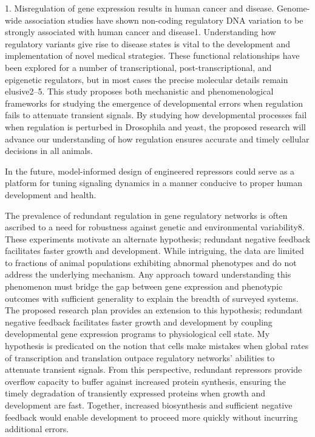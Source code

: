 1.	Misregulation of gene expression results in human cancer and disease. Genome-wide association studies have shown non-coding regulatory DNA variation to be strongly associated with human cancer and disease1. Understanding how regulatory variants give rise to disease states is vital to the development and implementation of novel medical strategies. These functional relationships have been explored for a number of transcriptional, post-transcriptional, and epigenetic regulators, but in most cases the precise molecular details remain elusive2–5. This study proposes both mechanistic and phenomenological frameworks for studying the emergence of developmental errors when regulation fails to attenuate transient signals. By studying how developmental processes fail when regulation is perturbed in Drosophila and yeast, the proposed research will advance our understanding of how regulation ensures accurate and timely cellular decisions in all animals.  

In the future, model-informed design of engineered repressors could serve as a platform for tuning signaling dynamics in a manner conducive to proper human development and health.

The prevalence of redundant regulation in gene regulatory networks is often ascribed to a need for robustness against genetic and environmental variability8. These experiments motivate an alternate hypothesis; redundant negative feedback facilitates faster growth and development. While intriguing, the data are limited to fractions of animal populations exhibiting abnormal phenotypes and do not address the underlying mechanism. Any approach toward understanding this phenomenon must bridge the gap between gene expression and phenotypic outcomes with sufficient generality to explain the breadth of surveyed systems. The proposed research plan provides an extension to this hypothesis; redundant negative feedback facilitates faster growth and development by coupling developmental gene expression programs to physiological cell state. My hypothesis is predicated on the notion that cells make mistakes when global rates of transcription and translation outpace regulatory networks’ abilities to attenuate transient signals. From this perspective, redundant repressors provide overflow capacity to buffer against increased protein synthesis, ensuring the timely degradation of transiently expressed proteins when growth and development are fast. Together, increased biosynthesis and sufficient negative feedback would enable development to proceed more quickly without incurring additional errors.

